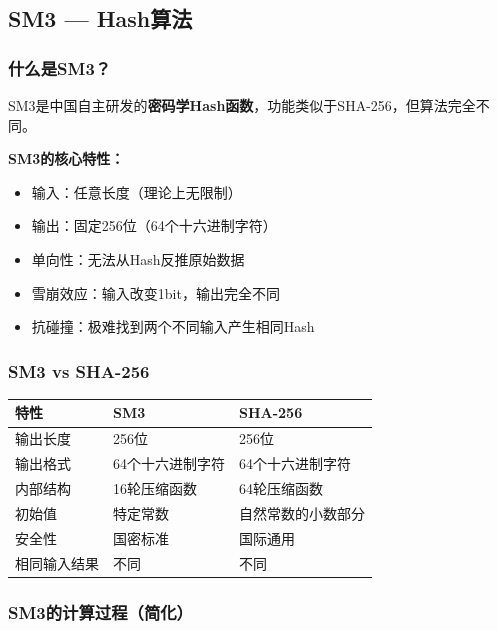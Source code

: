 ﻿\documentclass[12pt,a4paper]{article}
\begin{document}
\subsection{SM3 — Hash算法}

\subsubsection{什么是SM3？}

SM3是中国自主研发的\textbf{密码学Hash函数}，功能类似于SHA-256，但算法完全不同。

\begin{theorybox}
\textbf{SM3的核心特性：}
\begin{itemize}
\item 输入：任意长度（理论上无限制）
\item 输出：固定256位（64个十六进制字符）
\item 单向性：无法从Hash反推原始数据
\item 雪崩效应：输入改变1bit，输出完全不同
\item 抗碰撞：极难找到两个不同输入产生相同Hash
\end{itemize}
\end{theorybox}

\subsubsection{SM3 vs SHA-256}

\begin{center}
\begin{tabular}{|l|l|l|}
\hline
\textbf{特性} & \textbf{SM3} & \textbf{SHA-256} \\
\hline
输出长度 & 256位 & 256位 \\
\hline
输出格式 & 64个十六进制字符 & 64个十六进制字符 \\
\hline
内部结构 & 16轮压缩函数 & 64轮压缩函数 \\
\hline
初始值 & 特定常数 & 自然常数的小数部分 \\
\hline
安全性 & 国密标准 & 国际通用 \\
\hline
相同输入结果 & 不同 & 不同 \\
\hline
\end{tabular}
\end{center}

\subsubsection{SM3的计算过程（简化）}
\end{document}
